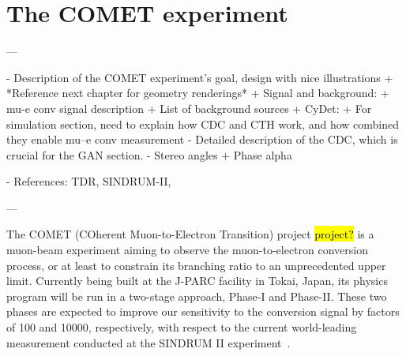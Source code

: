 \chapter{The COMET experiment}\label{chapter2}

\begin{markdown}
---

- Description of the COMET experiment's goal, design with nice illustrations
    + *Reference next chapter for geometry renderings*
    + Signal and background:
        + mu-e conv signal description
        + List of background sources
+ CyDet:
    + For simulation section, need to explain how CDC and CTH work, and how combined they enable mu--e conv measurement
    - Detailed description of the CDC, which is crucial for the GAN section.
     - Stereo angles
+ Phase alpha

- References: TDR, SINDRUM-II, 

---
\end{markdown}

The COMET (COherent Muon-to-Electron Transition) project \hl{project?} is a muon-beam experiment aiming to observe the muon-to-electron conversion process, or at least to constrain its branching ratio to an unprecedented upper limit.
Currently being built at the J-PARC facility in Tokai, Japan, its physics program will be run in a two-stage approach, Phase-I and Phase-II. These two phases are expected to improve our sensitivity to the conversion signal by factors of 100 and \num{10000}, respectively, with respect to the current world-leading measurement conducted at the SINDRUM II experiment~\cite{Bertl:2006up}.



